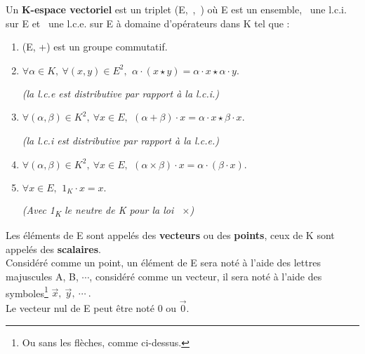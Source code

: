Un \textbf{K-espace vectoriel} est un triplet (E,\ \lci,\ \lce ) où E est un ensemble, \lci\, une l.c.i. sur E et \lce \ une l.c.e. sur E à domaine d'opérateurs dans K tel que : \vspace{-0.1cm}
\begin{enumerate}[leftmargin=2cm]
    \item (E, +) est un groupe commutatif. \vspace{0.1cm}
    
    \item \(\forall \alpha \in K, \ \forall (x,y)\in E^2,\ \, \alpha \cdot (x\star y) = \alpha \cdot x \star \alpha \cdot y.\) \\
    \begin{small}\emph{(la l.c.e est distributive par rapport à la l.c.i.)}\end{small} \vspace{0.1cm}
    
    \item \( \forall(\alpha, \beta)\in K^2,\ \forall x\in E,\  \,(\alpha + \beta) \cdot x = \alpha \cdot x \star \beta \cdot x \). \\
    \begin{small}\emph{(la l.c.i est distributive par rapport à la l.c.e.)}\end{small} \vspace{0.1cm}
    
    \item \( \forall(\alpha, \beta)\in K^2,\ \forall x\in E,\  \,(\alpha \times \beta)\cdot x= \alpha \cdot (\beta \cdot x). \) \vspace{0.1cm}
    
    \item \(\forall x\in E,\ \,1_K \cdot x = x. \) \\
     \begin{small}\emph{(Avec 1\textsubscript{K} le neutre de K pour la loi \ \(\times\))}\end{small}
\end{enumerate}

\vspace{0.5cm}

\noindent Les éléments de E sont appelés des \textbf{vecteurs} ou des \textbf{points}, ceux de K sont appelés des \textbf{scalaires}.\vspace{0.1cm} \\
Considéré comme un point, un élément de E sera noté à l'aide des lettres majuscules A, B, $\cdots$, considéré comme un vecteur, il sera noté à l'aide des symboles\footnote{Ou sans les flèches, comme ci-dessus.} \(\vec{x},\ \vec{y},\ \cdots\ .\) \\
Le vecteur nul de E peut être noté 0 ou \(\vec{0}\).\vspace{0.3cm}

